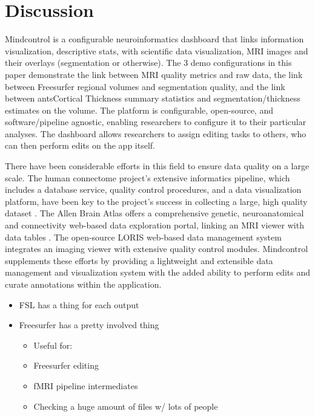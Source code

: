 \section{Discussion}

Mindcontrol is a configurable neuroinformatics dashboard that links information visualization, descriptive stats, with scientific data visualization, MRI images and their overlays (segmentation or otherwise). The 3 demo configurations in this paper demonstrate the link between MRI quality metrics and raw data, the link between Freesurfer regional volumes and segmentation quality, and the link between antsCortical Thickness summary statistics and segmentation/thickness estimates on the volume. The platform is configurable, open-source, and software/pipeline agnostic, enabling researchers to configure it to their particular analyses. The dashboard allows researchers to assign editing tasks to others, who can then perform edits on the app itself. 

There have been considerable efforts in this field to ensure data quality on a large scale. The human connectome project's extensive informatics pipeline, which includes a database service, quality control procedures, and a data visualization platform, have been key to the project's success in collecting a large, high quality dataset \cite{Marcus_2013}. The Allen Brain Atlas offers a comprehensive genetic, neuroanatomical and connectivity web-based data exploration portal, linking an MRI viewer with data tables \cite{Sunkin_2012}. The open-source LORIS web-based data management system integrates an imaging viewer with extensive quality control modules\cite{Das_2012}. Mindcontrol supplements these efforts by providing a lightweight and extensible data management and visualization system with the added ability to perform edits and curate annotations within the application. 

\begin{itemize}
\item FSL has a thing for each output
\item Freesurfer has a pretty involved thing
    \begin{itemize}
    \item Useful for:
    \item Freesurfer editing
    \item fMRI pipeline intermediates
    \item Checking a huge amount of files w/ lots of people
    \end{itemize}
\end{itemize}



